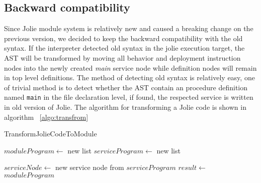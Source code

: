\subsection{Backward compatibility}

Since Jolie module system is relatively new and caused a breaking change on the previous version, we decided to keep the backward compatibility with the old syntax. If the interpreter detected old syntax in the jolie execution target, the AST will be transformed by moving all behavior and deployment instruction nodes into the newly created \textit{main} service node while definition nodes will remain in top level definitions. The method of detecting old syntax is relatively easy, one of trivial method is to detect whether the AST contain an procedure definition named \texttt{main} in the file declaration level, if found, the respected service is written in old version of Jolie. The algorithm for transforming a Jolie code is shown in algorithm ~\ref{algo:transfrom}

\begin{algorithm}[ht]
    \caption{TransformJolieCodeToModule}
    \label{algo:transfrom}
    \begin{algorithmic}[1]

        \State $moduleProgram\gets$ new list
        \State $serviceProgram\gets$ new list

        \State {}
        \Else
        \State {}
        \EndIf
        \EndIf
        \EndFor
        \State $serviceNode \gets$ new service node from $serviceProgram$
        \State {}
        \State $result \gets$ $moduleProgram$
        \EndProcedure

    \end{algorithmic}
\end{algorithm}

\FloatBarrier